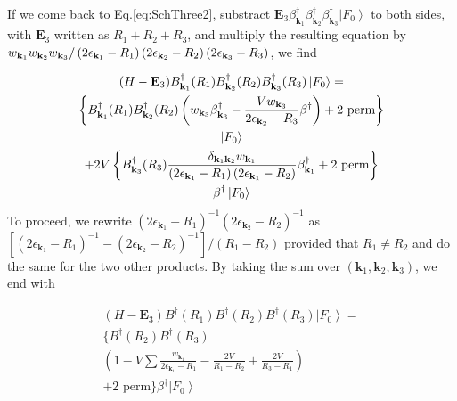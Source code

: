 \documentclass[aps,prb,superscriptaddress,twocolumn]{revtex4}
\begin{document}
If we come back to Eq.\eqref{eq:SchThree2}, substract $\mathbf{E}
_3\beta^{\dagger}_{\mathbf{k} _1}\beta^{\dagger}_{\mathbf{k}
_2}\beta^{\dagger}_{\mathbf{k} _3}\left|F_0\right>  $ to both sides, with $%
\mathbf{E} _3$ written as $R_1+R_2+R_3$, and multiply the resulting equation
by $w_{\mathbf{k} _1}w_{\mathbf{k} _2}w_{\mathbf{k} _3}/\left(2\epsilon_{%
\mathbf{k} _1}-R_1\right) \left(2\epsilon_{\mathbf{k} _2}-R_2\right)
\left(2\epsilon_{\mathbf{k} _3}-R_3\right) $, we find

\begin{multline}  \label{eq:SchThree3}
(H-\mathbf{E} _3)B^{\dagger}_{\mathbf{k} _1}(R_1)B^{\dagger}_{\mathbf{k}
_2}(R_2)B^{\dagger}_{\mathbf{k} _3}(R_3)\left|F_0\right>  = \\
\left\{B^{\dagger}_{\mathbf{k} _1}(R_1)B^{\dagger}_{\mathbf{k}
_2}(R_2)\left(w_{\mathbf{k} _3}\beta^{\dagger}_{\mathbf{k} _3}-\frac{Vw_{%
\mathbf{k} _3}}{2\epsilon_{\mathbf{k} _2}-R_3}\beta^{\dagger}\right) +\text{%
2 perm}\right\}  \\
\left|F_0\right>   \\
+2V\left\{B^{\dagger}_{\mathbf{k} _3}(R_3)\frac{\delta_{\mathbf{k} _1\mathbf{%
k} _2}w_{\mathbf{k} _1}}{\left(2\epsilon_{\mathbf{k} _1}-R_1\right)
\left(2\epsilon_{\mathbf{k} _1}-R_2\right) }\beta^{\dagger}_{\mathbf{k} _1}+%
\text{2 perm}\right\}  \\
\beta^{\dagger}\left|F_0\right>  
\end{multline}
To proceed, we rewrite $\left(2\epsilon_{\mathbf{k} _1}-R_1\right)
^{-1}\left(2\epsilon_{\mathbf{k} _2}-R_2\right) ^{-1}$ as $\left[%
\left(2\epsilon_{\mathbf{k} _1}-R_1\right) ^{-1}-\left(2\epsilon_{\mathbf{k}
_2}-R_2\right) ^{-1}\right] /\left(R_1-R_2\right) $ provided that $R_1\neq{}%
R_2$ and do the same for the two other products. By taking the sum over $%
\left(\mathbf{k} _1,\mathbf{k} _2,\mathbf{k} _3\right) $, we end with

\begin{multline}  \label{eq:SchThree4}
(H-\mathbf{E} _3)B^{\dagger}(R_1)B^{\dagger}(R_2)B^{\dagger}(R_3)\left|F_0%
\right>  = \\
\{B^{\dagger}(R_2)B^{\dagger}(R_3) \\
\left(1-V\sum\frac{w_{\mathbf{k} _1}}{2\epsilon_{\mathbf{k} _1}-R_1}-\frac{2V%
}{R_1-R_2}+\frac{2V}{R_3-R_1}\right)  \\
+\text{2 perm}\}\beta^{\dagger}\left|F_0\right>  
\end{multline}
\end{document}
